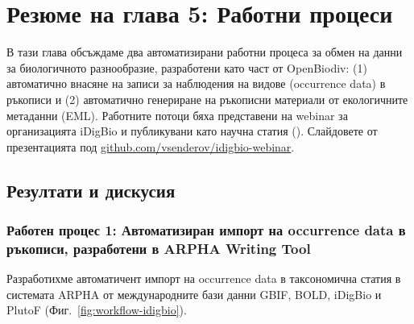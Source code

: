 \chapter{Резюме на глава 5: Работни процеси}
\label{chapter-case-study}

В тази глава обсъждаме два автоматизирани работни процеса за обмен на данни за биологичното разнообразие, разработени като част от OpenBiodiv: (1) автоматично внасяне на записи за наблюдения на видове (occurrence data) в ръкописи и (2) автоматично генериране на ръкописни материали от екологичните метаданни (EML). Работните потоци бяха представени на webinar за организацията iDigBio и публикувани като научна статия (\cite{senderov_online_2016}). Слайдовете от презентацията под \href{https://github.com/vsenderov/idigbio-webinar}{github.com/vsenderov/idigbio-webinar}.

\section{Резултати и дискусия}

\subsection{Работен процес 1: Автоматизиран импорт на occurrence data в ръкописи, разработени в ARPHA Writing Tool}

Разработихме автоматичент импорт на occurrence data в таксономична статия в системата ARPHA от международните бази данни GBIF, BOLD, iDigBio и PlutoF (Фиг.~\ref{fig:workflow-idigbio}).

